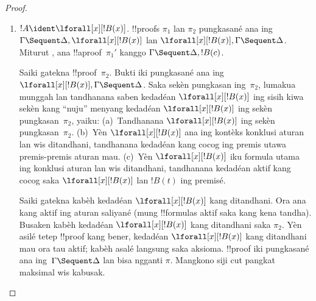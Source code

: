 \documentclass[../../../include/open-logic-section]{subfiles}
\begin{document}
\begin{proof}
\begin{enumerate}
   (inversi kanggo
  \LeftR{\lif} kang ditrapaké marang~$\pi_2$), ana
  !!a{proof} $\pi_2'$ kanggo $\Gamma \Sequent \Delta, !B$
  lan !!a{proof} $\pi_2''$ kanggo
  $!C, \Gamma \Sequent \Delta$. Kanthi ngetrapaké
   marang $\pi_2''$,
  kita uga ngolèhaké !!a{proof}~$\pi_2'''$ kanggo
  $!C, !B, \Gamma \Sequent \Delta$. !!{proof}~$\pi'$ iki:
  \[
  \AxiomC{}
  \RightLabel{$\pi_2'$}
  \Deduce$\Gamma \fCenter \Delta, !B$
  \AxiomC{}
  \RightLabel{$\pi_1'$}
  \Deduce$!B, \Gamma \fCenter \Delta, !C$
  \AxiomC{}
  \RightLabel{$\pi_2'''$}
  \Deduce$!C, !B, \Gamma \fCenter \Delta$
  \RightLabel{\CutCS}
  \BinaryInf$!B, \Gamma \fCenter \Delta$
  \RightLabel{\CutCS}
  \BinaryInf$\Gamma \fCenter \Delta$
  \DisplayProof
  \]
  \item $!A \ident \lforall[x][!B(x)]$. !!{proof}s $\pi_1$ lan
  $\pi_2$ pungkasané ana ing
  $\Gamma \Sequent \Delta, \lforall[x][!B(x)]$ lan
  $\lforall[x][!B(x)], \Gamma \Sequent \Delta$. Miturut
  , ana !!a{proof}~$\pi_1'$ kanggo
  $\Gamma \Sequent \Delta, !B(c)$.

  Saiki gatekna !!{proof}~$\pi_2$. Bukti iki pungkasané ana ing
  $\lforall[x][!B(x)], \Gamma \Sequent \Delta$. Saka sekèn
  pungkasan ing~$\pi_2$, lumakua munggah lan tandhanana
  saben kedadéan $\lforall[x][!B(x)]$ ing sisih kiwa sekèn kang
  ``nuju'' menyang kedadéan $\lforall[x][!B(x)]$ ing sekèn
  pungkasan~$\pi_2$, yaiku:
  (a)~Tandhanana $\lforall[x][!B(x)]$ ing sekèn pungkasan~$\pi_2$.
  (b)~Yèn $\lforall[x][!B(x)]$ ana ing kontèks konklusi aturan
  lan wis ditandhani, tandhanana kedadéan kang cocog ing
  premis utawa premis-premis aturan mau.
  (c)~Yèn $\lforall[x][!B(x)]$ iku formula utama ing konklusi
  aturan \LeftR{\lforall} lan wis ditandhani, tandhanana
  kedadéan aktif kang cocog saka $\lforall[x][!B(x)]$ lan $!B(t)$
  ing premisé.

  Saiki gatekna kabèh kedadéan $\lforall[x][!B(x)]$ kang
  ditandhani. Ora ana kang aktif ing aturan saliyané
  \LeftR{\lforall} (mung !!{formula}s aktif saka
  \LeftR{\lforall} kang kena tandha). Busaken kabèh
  kedadéan $\lforall[x][!B(x)]$ kang ditandhani saka $\pi_2$.
  Yèn asilé tetep !!{proof} kang bener, kedadéan
  $\lforall[x][!B(x)]$ kang ditandhani mau ora tau aktif;
  kabèh asalé langsung saka aksioma. !!{proof} iki pungkasané
  ana ing~$\Gamma \Sequent \Delta$ lan bisa ngganti $\pi$.
  Mangkono siji cut pangkat maksimal wis kabusak.


\end{enumerate}
\end{proof}
\end{document}
